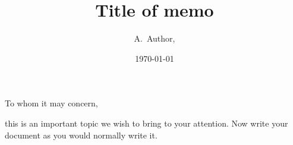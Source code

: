 \documentclass[DM,authoryear]{lsstdoc}
\title[Short title]{Title of memo}
\author{
A.~Author,
}
\date{\today}
\begin{document}
\mkmemotitle

To whom it may concern,

this is an important topic we wish to bring to your attention.
Now write your document as you would normally write it.
\end{document}
